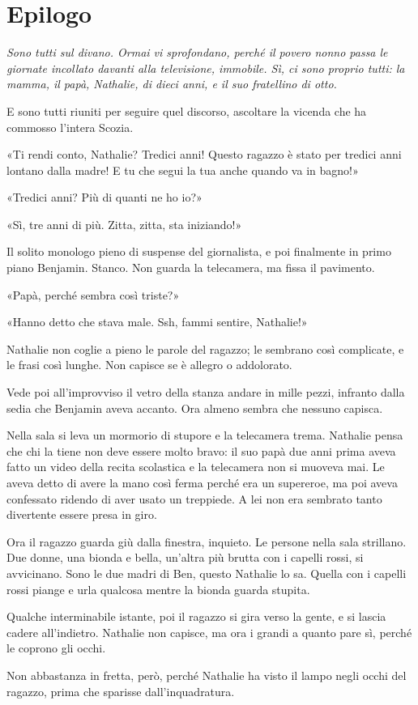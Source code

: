 \chapter{Epilogo}
\label{ch:epilogo}

{\itshape Sono tutti sul divano. Ormai vi sprofondano, perché il povero nonno passa le giornate
incollato davanti alla televisione, immobile. Sì, ci sono proprio tutti: la mamma, il papà,
Nathalie, di dieci anni, e il suo fratellino di otto.

E sono tutti riuniti per seguire quel discorso, ascoltare la vicenda che ha commosso l’intera
Scozia.

«Ti rendi conto, Nathalie? Tredici anni! Questo ragazzo è stato per tredici anni lontano dalla
madre! E tu che segui la tua anche quando va in bagno!»

«Tredici anni? Più di quanti ne ho io?»

«Sì, tre anni di più. Zitta, zitta, sta iniziando!»

Il solito monologo pieno di suspense del giornalista, e poi finalmente in primo piano Benjamin.
Stanco. Non guarda la telecamera, ma fissa il pavimento.

«Papà, perché sembra così triste?»

«Hanno detto che stava male. Ssh, fammi sentire, Nathalie!»

Nathalie non coglie a pieno le parole del ragazzo; le sembrano così complicate, e le frasi così
lunghe. Non capisce se è allegro o addolorato.

Vede poi all’improvviso il vetro della stanza andare in mille pezzi, infranto dalla sedia che
Benjamin aveva accanto. Ora almeno sembra che nessuno capisca.

Nella sala si leva un mormorio di stupore e la telecamera trema. Nathalie pensa che chi la tiene non
deve essere molto bravo: il suo papà due anni prima aveva fatto un video della recita scolastica e
la telecamera non si muoveva mai. Le aveva detto di avere la mano così ferma perché era un
supereroe, ma poi aveva confessato ridendo di aver usato un treppiede. A lei non era sembrato tanto
divertente essere presa in giro.

Ora il ragazzo guarda giù dalla finestra, inquieto. Le persone nella sala strillano. Due donne, una
bionda e bella, un’altra più brutta con i capelli rossi, si avvicinano. Sono le due madri di Ben,
questo Nathalie lo sa. Quella con i capelli rossi piange e urla qualcosa mentre la bionda guarda
stupita.

Qualche interminabile istante, poi il ragazzo si gira verso la gente, e si lascia cadere
all’indietro. Nathalie non capisce, ma ora i grandi a quanto pare sì, perché le coprono gli occhi.

Non abbastanza in fretta, però, perché Nathalie ha visto il lampo negli occhi del ragazzo, prima che
sparisse dall’inquadratura. \/}
